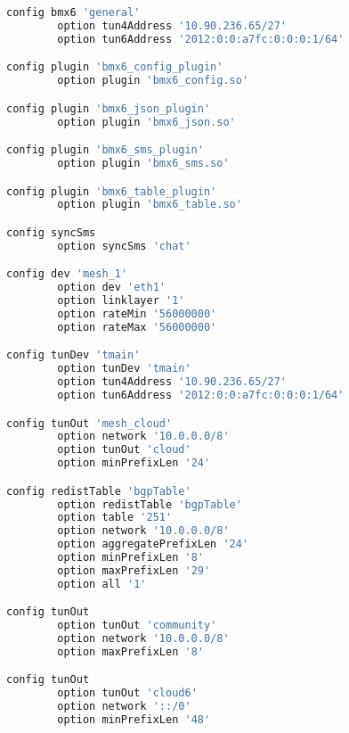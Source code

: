 \begin{lstlisting}[language=bash, caption={BMX6}]
config bmx6 'general'
        option tun4Address '10.90.236.65/27'
        option tun6Address '2012:0:0:a7fc:0:0:0:1/64'

config plugin 'bmx6_config_plugin'
        option plugin 'bmx6_config.so'

config plugin 'bmx6_json_plugin'
        option plugin 'bmx6_json.so'

config plugin 'bmx6_sms_plugin'
        option plugin 'bmx6_sms.so'

config plugin 'bmx6_table_plugin'
        option plugin 'bmx6_table.so'

config syncSms
        option syncSms 'chat'

config dev 'mesh_1'
        option dev 'eth1'
        option linklayer '1'
        option rateMin '56000000'
        option rateMax '56000000'

config tunDev 'tmain'
        option tunDev 'tmain'
        option tun4Address '10.90.236.65/27'
        option tun6Address '2012:0:0:a7fc:0:0:0:1/64'

config tunOut 'mesh_cloud'
        option network '10.0.0.0/8'
        option tunOut 'cloud'
        option minPrefixLen '24'

config redistTable 'bgpTable'
        option redistTable 'bgpTable'
        option table '251'
        option network '10.0.0.0/8'
        option aggregatePrefixLen '24'
        option minPrefixLen '8'
        option maxPrefixLen '29'
        option all '1'

config tunOut
        option tunOut 'community'
        option network '10.0.0.0/8'
        option maxPrefixLen '8'

config tunOut
        option tunOut 'cloud6'
        option network '::/0'
        option minPrefixLen '48'
\end{lstlisting}